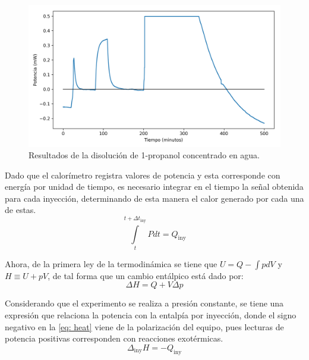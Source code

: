 		\begin{figure}[h]
			\centering
			\includegraphics[width=\linewidth]{../Data/ChemicalCalibrations/concentratedPropanol}
			\caption{Resultados de la disoluci\'on de 1-propanol concentrado en agua.}
			\label{fig: CPropanolResults}
		\end{figure}
		
		Dado que el calor\'imetro registra valores de potencia y esta corresponde con energ\'ia por unidad de tiempo, es necesario integrar en el tiempo la se\~nal obtenida para cada inyecci\'on, determinando de esta manera el calor generado por cada una de estas.
		\begin{equation}\label{eq: heat}
			\int\limits_t^{t + \Delta t_\text{iny}} Pdt = Q_\text{iny}
		\end{equation}
		
		Ahora, de la primera ley de la termodin\'amica se tiene que $U = Q - \int pdV$ y $H\equiv U+pV$, de tal forma que un cambio ent\'alpico est\'a dado por:
		\begin{equation}\label{eq: enthalpy}
			\Delta H = Q + V\Delta p
		\end{equation}
		
		Considerando que el experimento se realiza a presi\'on constante, se tiene una expresi\'on que relaciona la potencia con la entalp\'ia por inyecci\'on, donde el signo negativo en la \autoref{eq: heat} viene de la polarizaci\'on del equipo, pues lecturas de potencia positivas corresponden con reacciones exot\'ermicas.
		\begin{equation}
			\Delta_\text{iny} H = -Q_\text{iny}
		\end{equation}
		
